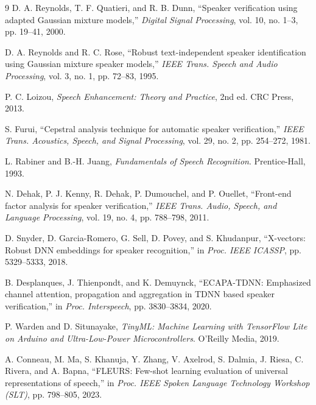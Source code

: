 \documentclass[9pt,technote,a4paper]{IEEEtran}
\begin{document}
\begin{thebibliography}{9}
D. A. Reynolds, T. F. Quatieri, and R. B. Dunn, \enquote{Speaker verification using adapted Gaussian mixture models,} \textit{Digital Signal Processing}, vol. 10, no. 1--3, pp. 19--41, 2000.

D. A. Reynolds and R. C. Rose, \enquote{Robust text-independent speaker identification using Gaussian mixture speaker models,} \textit{IEEE Trans. Speech and Audio Processing}, vol. 3, no. 1, pp. 72--83, 1995.

P. C. Loizou, \textit{Speech Enhancement: Theory and Practice}, 2nd ed. CRC Press, 2013.

S. Furui, \enquote{Cepstral analysis technique for automatic speaker verification,} \textit{IEEE Trans. Acoustics, Speech, and Signal Processing}, vol. 29, no. 2, pp. 254--272, 1981.

L. Rabiner and B.-H. Juang, \textit{Fundamentals of Speech Recognition}. Prentice-Hall, 1993.

N. Dehak, P. J. Kenny, R. Dehak, P. Dumouchel, and P. Ouellet, \enquote{Front-end factor analysis for speaker verification,} \textit{IEEE Trans. Audio, Speech, and Language Processing}, vol. 19, no. 4, pp. 788--798, 2011.

D. Snyder, D. Garcia-Romero, G. Sell, D. Povey, and S. Khudanpur, \enquote{X-vectors: Robust DNN embeddings for speaker recognition,} in \textit{Proc. IEEE ICASSP}, pp. 5329--5333, 2018.

B. Desplanques, J. Thienpondt, and K. Demuynck, \enquote{ECAPA-TDNN: Emphasized channel attention, propagation and aggregation in TDNN based speaker verification,} in \textit{Proc. Interspeech}, pp. 3830--3834, 2020.

P. Warden and D. Situnayake, \textit{TinyML: Machine Learning with TensorFlow Lite on Arduino and Ultra-Low-Power Microcontrollers}. O'Reilly Media, 2019.

A. Conneau, M. Ma, S. Khanuja, Y. Zhang, V. Axelrod, S. Dalmia, J. Riesa, C. Rivera, and A. Bapna, \enquote{FLEURS: Few-shot learning evaluation of universal representations of speech,} in \textit{Proc. IEEE Spoken Language Technology Workshop (SLT)}, pp. 798--805, 2023.
\end{thebibliography}
\end{document}
